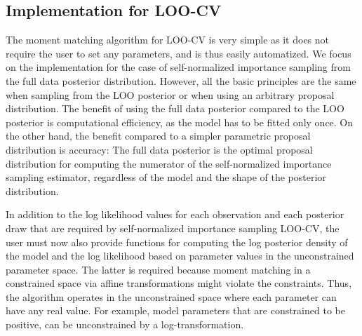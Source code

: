 \documentclass[12pt]{article}
\begin{document}
\subsection{Implementation for LOO-CV}


The moment matching algorithm for LOO-CV is very simple as it does not require
the user to set any parameters, and is thus easily automatized.
We focus on the implementation for the case
of self-normalized importance sampling from the full data posterior
distribution. However, all the basic principles are the same
when sampling from the LOO posterior or when using
an arbitrary proposal distribution.
The benefit of using the full data posterior compared to the LOO posterior
is computational efficiency, as the model has to be fitted only once.
On the other hand, the benefit compared to a simpler parametric proposal distribution
is accuracy: The full data posterior is the optimal proposal distribution
for computing the numerator of the self-normalized importance sampling
estimator, regardless of the model and the shape
of the posterior distribution.



In addition to the log likelihood values for each observation and
each posterior draw that are required by self-normalized importance sampling LOO-CV,
the user must now also provide functions for computing the log posterior density of the model
and the log likelihood based on parameter values in the unconstrained parameter space. The latter is required because moment matching in a constrained space via affine transformations might violate the constraints. Thus, the algorithm operates in the unconstrained space where each parameter can have any real value.
For example, model parameters that are constrained to be positive, can be unconstrained by a log-transformation.
\end{document}
